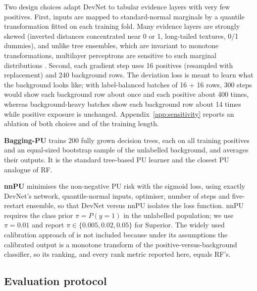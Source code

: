 \documentclass[pdflatex,sn-apa]{sn-jnl}
\begin{document}
Two design choices adapt DevNet to tabular evidence layers with very few positives. First, inputs are mapped to standard-normal marginals by a quantile transformation fitted on each training fold. Many evidence layers are strongly skewed (inverted distances concentrated near 0 or 1, long-tailed textures, 0/1 dummies), and unlike tree ensembles, which are invariant to monotone transformations, multilayer perceptrons are sensitive to such marginal distributions \citep{Gorishniy2021,Grinsztajn2022}. Second, each gradient step uses 16 positives (resampled with replacement) and 240 background rows. The deviation loss is meant to learn what the background looks like; with label-balanced batches of 16 + 16 rows, 300 steps would show each background row about once and each positive about 400 times, whereas background-heavy batches show each background row about 14 times while positive exposure is unchanged. Appendix~\ref{app:sensitivity} reports an ablation of both choices and of the training length.

\textbf{Bagging-PU} \citep{Mordelet2014} trains 200 fully grown decision trees, each on all training positives and an equal-sized bootstrap sample of the unlabelled background, and averages their outputs. It is the standard tree-based PU learner and the closest PU analogue of RF.

\textbf{nnPU} \citep{Kiryo2017} minimises the non-negative PU risk with the sigmoid loss, using exactly DevNet's network, quantile-normal inputs, optimiser, number of steps and five-restart ensemble, so that DevNet versus nnPU isolates the loss function. nnPU requires the class prior $\pi = P(y=1)$ in the unlabelled population; we use $\pi = 0.01$ and report $\pi \in \{0.005, 0.02, 0.05\}$ for Superior. The widely used calibration approach of \citet{Elkan2008} is not included because under its assumptions the calibrated output is a monotone transform of the positive-versus-background classifier, so its ranking, and every rank metric reported here, equals RF's.

\subsection{Evaluation protocol}\label{sec:protocol}
\end{document}
